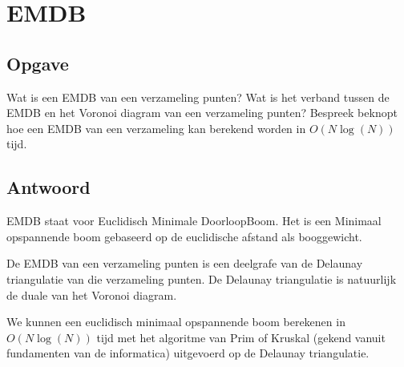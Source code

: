 \documentclass[examenvragen.tex]{subfiles}
\begin{document}
\section{EMDB}
\subsection{Opgave}
Wat is een EMDB van een verzameling punten? Wat is het verband tussen de EMDB en het Voronoi diagram van een verzameling punten?
Bespreek beknopt hoe een EMDB van een verzameling kan berekend worden in $O(N\log (N))$ tijd.

\subsection{Antwoord}
EMDB staat voor Euclidisch Minimale DoorloopBoom. Het is een Minimaal opspannende boom gebaseerd op de euclidische afstand als booggewicht.

De EMDB van een verzameling punten is een deelgrafe van de Delaunay triangulatie van die verzameling punten. De Delaunay triangulatie is natuurlijk de duale van het Voronoi diagram.

We kunnen een euclidisch minimaal opspannende boom berekenen in $O(N\log(N))$ tijd met het algoritme van Prim of Kruskal (gekend vanuit fundamenten van de informatica) uitgevoerd op de Delaunay triangulatie.
\end{document}
